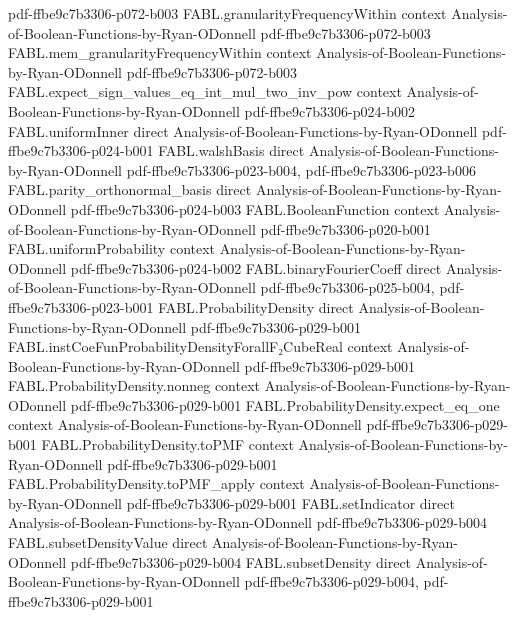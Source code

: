 \begin{theorem}
  {pdf-ffbe9c7b3306-p072-b003}
\proofstep
  {FABL.granularityFrequencyWithin}
  {context}
  {Analysis-of-Boolean-Functions-by-Ryan-ODonnell}
  {pdf-ffbe9c7b3306-p072-b003}
\proofstep
  {FABL.mem_granularityFrequencyWithin}
  {context}
  {Analysis-of-Boolean-Functions-by-Ryan-ODonnell}
  {pdf-ffbe9c7b3306-p072-b003}
\proofstep
  {FABL.expect_sign_values_eq_int_mul_two_inv_pow}
  {context}
  {Analysis-of-Boolean-Functions-by-Ryan-ODonnell}
  {pdf-ffbe9c7b3306-p024-b002}
\proofstep
  {FABL.uniformInner}
  {direct}
  {Analysis-of-Boolean-Functions-by-Ryan-ODonnell}
  {pdf-ffbe9c7b3306-p024-b001}
\proofstep
  {FABL.walshBasis}
  {direct}
  {Analysis-of-Boolean-Functions-by-Ryan-ODonnell}
  {pdf-ffbe9c7b3306-p023-b004,
    pdf-ffbe9c7b3306-p023-b006}
\proofstep
  {FABL.parity_orthonormal_basis}
  {direct}
  {Analysis-of-Boolean-Functions-by-Ryan-ODonnell}
  {pdf-ffbe9c7b3306-p024-b003}
\proofstep
  {FABL.BooleanFunction}
  {context}
  {Analysis-of-Boolean-Functions-by-Ryan-ODonnell}
  {pdf-ffbe9c7b3306-p020-b001}
\proofstep
  {FABL.uniformProbability}
  {context}
  {Analysis-of-Boolean-Functions-by-Ryan-ODonnell}
  {pdf-ffbe9c7b3306-p024-b002}
\proofstep
  {FABL.binaryFourierCoeff}
  {direct}
  {Analysis-of-Boolean-Functions-by-Ryan-ODonnell}
  {pdf-ffbe9c7b3306-p025-b004,
    pdf-ffbe9c7b3306-p023-b001}
\proofstep
  {FABL.ProbabilityDensity}
  {direct}
  {Analysis-of-Boolean-Functions-by-Ryan-ODonnell}
  {pdf-ffbe9c7b3306-p029-b001}
\proofstep
  {FABL.instCoeFunProbabilityDensityForallF₂CubeReal}
  {context}
  {Analysis-of-Boolean-Functions-by-Ryan-ODonnell}
  {pdf-ffbe9c7b3306-p029-b001}
\proofstep
  {FABL.ProbabilityDensity.nonneg}
  {context}
  {Analysis-of-Boolean-Functions-by-Ryan-ODonnell}
  {pdf-ffbe9c7b3306-p029-b001}
\proofstep
  {FABL.ProbabilityDensity.expect_eq_one}
  {context}
  {Analysis-of-Boolean-Functions-by-Ryan-ODonnell}
  {pdf-ffbe9c7b3306-p029-b001}
\proofstep
  {FABL.ProbabilityDensity.toPMF}
  {context}
  {Analysis-of-Boolean-Functions-by-Ryan-ODonnell}
  {pdf-ffbe9c7b3306-p029-b001}
\proofstep
  {FABL.ProbabilityDensity.toPMF_apply}
  {context}
  {Analysis-of-Boolean-Functions-by-Ryan-ODonnell}
  {pdf-ffbe9c7b3306-p029-b001}
\proofstep
  {FABL.setIndicator}
  {direct}
  {Analysis-of-Boolean-Functions-by-Ryan-ODonnell}
  {pdf-ffbe9c7b3306-p029-b004}
\proofstep
  {FABL.subsetDensityValue}
  {direct}
  {Analysis-of-Boolean-Functions-by-Ryan-ODonnell}
  {pdf-ffbe9c7b3306-p029-b004}
\proofstep
  {FABL.subsetDensity}
  {direct}
  {Analysis-of-Boolean-Functions-by-Ryan-ODonnell}
  {pdf-ffbe9c7b3306-p029-b004,
    pdf-ffbe9c7b3306-p029-b001}
\proofstep

\end{theorem}
